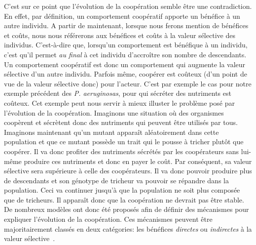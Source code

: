 		C'est sur ce point que l'évolution de la coopération semble être une contradiction. En effet, par définition, un comportement coopératif apporte un bénéfice à un autre individu. A partir de maintenant, lorsque nous ferons mention de bénéfices et coûts, nous nous référerons aux bénéfices et coûts à la valeur sélective des individus. C'est-à-dire que, lorsqu'un comportement est bénéfique à un individu, c'est qu'il permet \emph{au final} à cet individu d'accroître son nombre de descendants. Un comportement coopératif est donc un comportement qui augmente la valeur sélective d'un autre individu. Parfois même, coopérer est coûteux (d'un point de vue de la valeur sélective donc) pour l'acteur. C'est par exemple le cas pour notre exemple précédent des \emph{P. aeruginosas}, pour qui sécréter des nutriments est coûteux. Cet exemple peut nous servir à mieux illuster le problème posé par l'évolution de la coopération. Imaginons une situation où des organismes coopèrent et sécrètent donc des nutriments qui peuvent être utilisés par tous. Imaginons maintenant qu'un mutant apparaît aléatoirement dans cette population et que ce mutant possède un trait qui le pousse à tricher plutôt que coopérer. Il va donc profiter des nutriments sécrétés par les coopérateurs sans lui-même produire ces nutriments et donc en payer le coût. Par conséquent, sa valeur sélective sera supérieure à celle des coopérateurs. Il va donc pouvoir produire plus de descendants et son génotype de tricheur va pouvoir se répandre dans la population. Ceci va continuer jusqu'à que la population ne soit plus composée que de tricheurs. Il apparaît donc que la coopération ne devrait pas être stable. De nombreux modèles ont donc été proposés afin de définir des mécanismes pour expliquer l'évolution de la coopération. Ces mécanismes peuvent être majoritairement classés en deux catégories: les bénéfices \emph{directes} ou \emph{indirectes} à la valeur sélective~\parencite{West2007a}.

